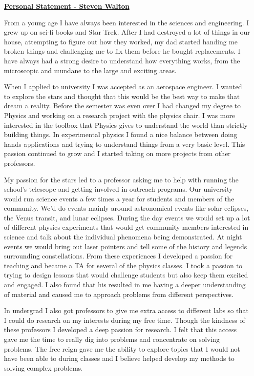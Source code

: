 \documentclass[12pt]{article}
\begin{document}
\begin{center}
\underline{\bf Personal Statement - Steven Walton}\\
\end{center}
From a young age I have always been interested in the sciences and engineering.
I grew up on sci-fi books and Star Trek. After I had destroyed a lot of things
in our house, attempting to figure out how they worked, my dad started handing
me broken things and challenging me to fix them before he bought replacements. I
have always had a strong desire to understand how everything works, from the
microscopic and mundane to the large and exciting areas. 

When I applied to university I was accepted as an aerospace engineer. I wanted
to explore the stars and thought that this would be the best way to make that
dream a reality. Before the semester was even over I had changed my degree to
Physics and working on a research project with the physics chair. I was more
interested in the toolbox that Physics gives to understand the world than
strictly building things. In experimental physics I found a nice balance between
doing hands applications and trying to understand things from a very basic
level. This passion continued to grow and I started taking on more projects from
other professors. 

My passion for the stars led to a professor asking me to help
with running the school's telescope and getting involved in outreach programs.
Our university would run science events a few times a year for students and
members of the community. We'd do events mainly around astronomical events like
solar eclipses, the Venus transit, and lunar eclipses. During the day events we
would set up a lot of different physics experiments that would get community
members interested in science and talk about the individual phenomena being
demonstrated. At night events we would bring out laser pointers and tell some of
the history and legends surrounding constellations. From these experiences I
developed a passion for teaching and became a TA for several of the physics
classes. I took a passion to trying to design lessons that would challenge
students but also keep them excited and engaged. I also found that his resulted
in me having a deeper understanding of material and caused me to approach
problems from different perspectives. 

In undergrad I also got professors to give me extra access to different labs so
that I could do research on my interests during my free time. Though the
kindness of these professors I developed a deep passion for research. I felt
that this access gave me the time to really dig into problems and concentrate on
solving problems. The free reign gave me the ability to explore topics that I
would not have been able to during classes and I believe helped develop my
methods to solving complex problems. 
\end{document}
